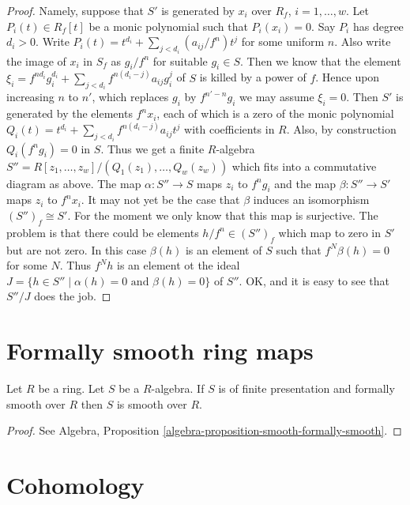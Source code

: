 \begin{proof}
Namely, suppose that $S'$ is generated by
$x_i$ over $R_f$, $i = 1, \ldots, w$. Let $P_i(t) \in R_f[t]$
be a monic polynomial such that $P_i(x_i) = 0$.
Say $P_i$ has degree $d_i > 0$. Write
$P_i(t) = t^{d_i} + \sum_{j < d_i} (a_{ij}/f^n) t^j$
for some uniform $n$. Also write
the image of $x_i$ in $S_f$ as $g_i / f^n$
for suitable $g_i \in S$. Then we know
that the element
$\xi_i = f^{nd_i} g_i^{d_i} + \sum_{j < d_i} f^{n(d_i - j)} a_{ij} g_i^j$
of $S$ is killed by a power of $f$.
Hence upon increasing $n$ to $n'$, which replaces
$g_i$ by $f^{n' - n}g_i$ we may assume $\xi_i = 0$.
Then $S'$ is generated by the elements
$f^n x_i$, each of which is a zero of the
monic polynomial $Q_i(t) = t^{d_i} +
\sum_{j < d_i} f^{n(d_i - j)} a_{ij} t^j$
with coefficients in $R$. Also, by construction
$Q_i(f^ng_i) = 0$ in $S$. Thus we get a finite $R$-algebra
$S'' = R[z_1, \ldots, z_w]/(Q_1(z_1), \ldots, Q_w(z_w))$
which fits into a commutative diagram as above.
The map $\alpha : S'' \to S$ maps $z_i$ to $f^ng_i$ and
the map $\beta : S'' \to S'$ maps $z_i$ to $f^nx_i$.
It may not yet be the case that $\beta$ induces an
isomorphism $(S'')_f \cong S'$.
For the moment we only know that this map
is surjective. The problem is that there could be
elements $h/f^n \in (S'')_f$ which map to zero
in $S'$ but are not zero. In this case $\beta(h)$
is an element of $S$ such that $f^N \beta(h) = 0$
for some $N$. Thus $f^N h$ is an element ot the ideal
$J = \{h \in S'' \mid \alpha(h) = 0 \text{ and }
\beta(h) = 0\}$ of $S''$. OK, and it is easy to see that
$S''/J$ does the job.
\end{proof}


\section{Formally smooth ring maps}
\label{section-formally-smooth}

\begin{lemma}
\label{lemma-formally-smooth-smooth}
Let $R$ be a ring. Let $S$ be a $R$-algebra.
If $S$ is of finite presentation and formally smooth over $R$
then $S$ is smooth over $R$.
\end{lemma}

\begin{proof}
See Algebra, Proposition \ref{algebra-proposition-smooth-formally-smooth}.
\end{proof}



\section{Cohomology}
\label{section-cohomology}


